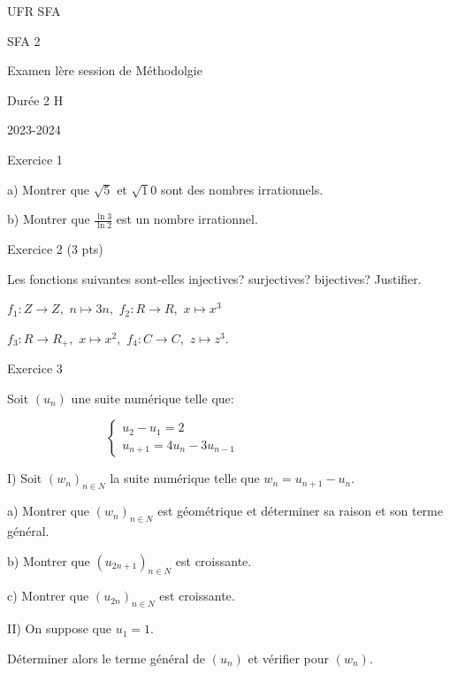 \documentclass[11pt, twoside]{article}
\begin{document}
UFR SFA

SFA 2

Examen l\`{e}re session de M\'{e}thodolgie

\bigskip 

Dur\'{e}e 2 H 

\bigskip 

2023-2024

Exercice 1

a) Montrer que $\surd 5$ et $\surd 10$  sont des nombres irrationnels.

b) Montrer que $\frac{\ln 3}{\ln 2}$ est un nombre irrationnel.

Exercice 2 (3 pts)

Les fonctions suivantes sont-elles injectives? surjectives? bijectives?
Justifier.

$f_{1}:Z\longrightarrow Z,$ $n\longmapsto 3n,$ $f_{2}:R\longrightarrow R,$ $%
x\longmapsto x^{3}$

$f_{3}:R\longrightarrow R_{+},$ $x\longmapsto x^{2},$ $f_{4}:C%
\longrightarrow C,$ $z\longmapsto z^{3}.$

Exercice 3

Soit $(u_{n})$ une suite num\'{e}rique telle que:

\bigskip $\qquad \qquad \qquad \qquad \left\{ 
\begin{array}{c}
u_{2}-u_{1}=2 \\ 
u_{n+1}=4u_{n}-3u_{n-1}%
\end{array}%
\right. $

I) Soit $(w_{n})_{n\in N}$ la suite num\'{e}rique telle que $%
w_{n}=u_{n+1}-u_{n}$.

a) Montrer que $(w_{n})_{n\in N}$  est g\'{e}om\'{e}trique et d\'{e}terminer
sa raison et son terme g\'{e}n\'{e}ral.

b) Montrer que $(u_{2n+1})_{n\in N}$ est croissante.

c) Montrer que $(u_{2n})_{n\in N}$ est croissante.

\bigskip 

II) On suppose que $u_{1}=1$.

D\'{e}terminer alors le terme g\'{e}n\'{e}ral de $(u_{n})$ et v\'{e}rifier
pour $(w_{n}).$
\end{document}
